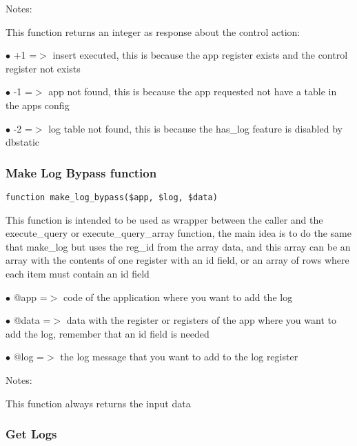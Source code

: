\documentclass[a4paper]{article}
\begin{document}
Notes:

This function returns an integer as response about the control action:

\begin{compactitem}
\item[\color{myblue}$\bullet$] +1 =$>$ insert executed, this is because the app register exists and the control register not exists
\item[\color{myblue}$\bullet$] -1 =$>$ app not found, this is because the app requested not have a table in the apps config
\item[\color{myblue}$\bullet$] -2 =$>$ log table not found, this is because the has\_log feature is disabled by dbstatic
\end{compactitem}

\hypertarget{toc490}{}
\subsubsection{Make Log Bypass function}

\begin{lstlisting}
function make_log_bypass($app, $log, $data)
\end{lstlisting}

This function is intended to be used as wrapper between the caller and the
execute\_query or execute\_query\_array function, the main idea is to do the
same that make\_log but uses the reg\_id from the array data, and this array
can be an array with the contents of one register with an id field, or an
array of rows where each item must contain an id field

\begin{compactitem}
\item[\color{myblue}$\bullet$] @app  =$>$ code of the application where you want to add the log
\item[\color{myblue}$\bullet$] @data =$>$ data with the register or registers of the app where you want to
         add the log, remember that an id field is needed
\item[\color{myblue}$\bullet$] @log  =$>$ the log message that you want to add to the log register
\end{compactitem}

Notes:

This function always returns the input data

\hypertarget{toc491}{}
\subsubsection{Get Logs}
\end{document}
